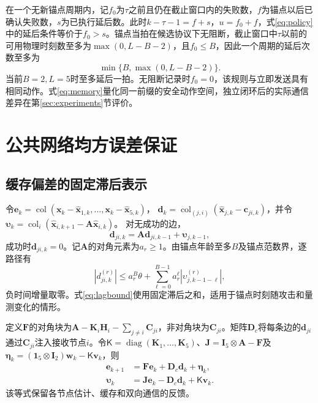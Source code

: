 \documentclass[UTF8,a4paper,zihao=5,fontset=windows]{ctexart}
\newcommand{\col}{\operatorname{col}}
\newcommand{\diag}{\operatorname{diag}}
\begin{document}
在一个无新锚点周期内，记$f_0$为$\tau$之前且仍在截止窗口内的失败数，$f$为锚点以后已确认失败数，$s$为已执行延后数。此时$k-\tau-1=f+s$，$u=f_0+f$，式\eqref{eq:policy}中的延后条件等价于$f_0>s$。锚点当拍在候选协议下无阻断，截止窗口中$\tau$以前的可用物理时刻数至多为$\max(0,L-B-2)$，且$f_0\le B$，因此一个周期的延后次数至多为
\begin{equation}
\min\{B,\max(0,L-B-2)\}.
\label{eq:cycle}
\end{equation}
当前$B=2,L=5$时至多延后一拍。无阻断记录时$f_0=0$，该规则与立即发送具有相同动作。式\eqref{eq:memory}量化同一前缀的安全动作空间，独立闭环后的实际通信差异在第\ref{sec:experiments}节评价。

\section{公共网络均方误差保证}
\subsection{缓存偏差的固定滞后表示}
令${\bm{e}}_k=\col({\bm{x}}_k-\hat {\bm{x}}_{1,k},\ldots,{\bm{x}}_k-\hat {\bm{x}}_{5,k})$，
${\bm{d}}_k=\col_{(j,i)}(\hat {\bm{x}}_{j,k}-{\bm{c}}_{ji,k})$，并令
${\bm{\upsilon}}_k=\col_i(\hat {\bm{x}}_{i,k+1}-{\bm{A}}\hat {\bm{x}}_{i,k})$。
对无成功的边，
\begin{equation}
{\bm{d}}_{ji,k}={\bm{A}}{\bm{d}}_{ji,k-1}+{\bm{\upsilon}}_{j,k-1},
\label{eq:cache_recursion}
\end{equation}
成功时${\bm{d}}_{ji,k}=0$。记${\bm{A}}$的对角元素为$a_r\ge1$。由锚点年龄至多$B$及锚点范数界，逐路径有
\begin{equation}
|d_{ji,k}^{(r)}|
\le a_r^B\theta+
\sum_{\ell=0}^{B-1}a_r^\ell
|\upsilon_{j,k-1-\ell}^{(r)}|,
\label{eq:lagbound}
\end{equation}
负时间增量取零。式\eqref{eq:lagbound}使用固定滞后之和，适用于锚点时刻随攻击和量测变化的情形。

定义${\bm{F}}$的对角块为${\bm{A}}-{\bm{K}}_i{\bm{H}}_i-\sum_{j\ne i}{\bm{C}}_{ji}$，非对角块为${\bm{C}}_{ji}$。矩阵${\bm{D}}_c$将每条边的${\bm{d}}_{ji}$通过${\bm{C}}_{ji}$注入接收节点$i$。令${\bm{\mathsf K}}=\diag({\bm{K}}_1,\ldots,{\bm{K}}_5)$、${\bm{J}}={\bm{I}}_5\otimes {\bm{A}}-{\bm{F}}$及${\bm{\eta}}_k=(\mathbf1_5\otimes {\bm{I}}_2){\bm{w}}_k-{\bm{\mathsf K}} {\bm{v}}_k$，则
\begin{equation}
\begin{aligned}
{\bm{e}}_{k+1}&={\bm{F}}{\bm{e}}_k+{\bm{D}}_c {\bm{d}}_k+{\bm{\eta}}_k,\\
{\bm{\upsilon}}_k&={\bm{J}}{\bm{e}}_k-{\bm{D}}_c {\bm{d}}_k+{\bm{\mathsf K}} {\bm{v}}_k.
\end{aligned}
\label{eq:error}
\end{equation}
该等式保留各节点估计、缓存和双向通信的反馈。
\end{document}
